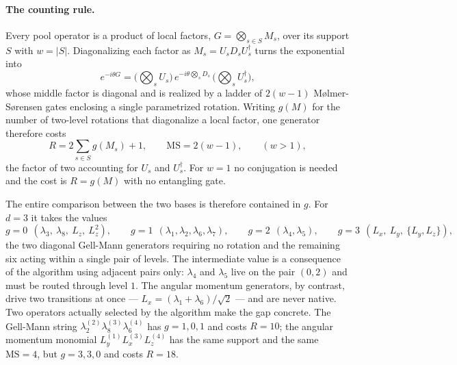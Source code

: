 \paragraph{The counting rule.} Every pool operator is a product of local factors, $G=\bigotimes_{s\in S} M_s$, over its support $S$ with $w=|S|$. Diagonalizing each factor as $M_s = U_s D_s U_s^\dagger$ turns the exponential into
\begin{equation}
\label{eq:ladder}
e^{-i\theta G}=\Big(\bigotimes_{s} U_s\Big)\,
e^{-i\theta \bigotimes_{s} D_s}\,
\Big(\bigotimes_{s} U_s^\dagger\Big),
\end{equation}
whose middle factor is diagonal and is realized by a ladder of $2(w-1)$ M\o{}lmer-S\o{}rensen gates enclosing a single parametrized rotation. Writing $g(M)$ for the number of two-level rotations that diagonalize a local factor, one generator therefore costs
\begin{equation}
\label{eq:gate_rule}
R = 2\sum_{s\in S} g(M_s) + 1,
\qquad
\mathrm{MS} = 2(w-1),
\qquad (w>1),
\end{equation}
the factor of two accounting for $U_s$ and $U_s^\dagger$. For $w=1$ no conjugation is needed and the cost is $R=g(M)$ with no entangling gate.

The entire comparison between the two bases is therefore contained in $g$. For $d=3$ it takes the values
\begin{equation}
\label{eq:givens_rule}
g=0 \ \ (\lambda_3,\ \lambda_8,\ L_z,\ L_z^2),
\qquad
g=1 \ \ (\lambda_1,\lambda_2,\lambda_6,\lambda_7),
\qquad
g=2 \ \ (\lambda_4,\lambda_5),
\qquad
g=3 \ \ (L_x,\ L_y,\ \{L_y,L_z\}),
\end{equation}
the two diagonal Gell-Mann generators requiring no rotation and the remaining six acting within a single pair of levels. The intermediate value is a consequence of the algorithm using adjacent pairs only: $\lambda_4$ and $\lambda_5$ live on the pair $(0,2)$ and must be routed through level $1$. The angular momentum generators, by contrast, drive two transitions at once --- $L_x=(\lambda_1+\lambda_6)/\sqrt2$ --- and are never native. Two operators actually selected by the algorithm make the gap concrete. The Gell-Mann string $\lambda_2^{(2)}\lambda_8^{(3)}\lambda_6^{(4)}$ has $g=1,0,1$ and costs $R=10$; the angular momentum monomial $L_y^{(1)}L_x^{(3)}L_z^{(4)}$ has the same support and the same $\mathrm{MS}=4$, but $g=3,3,0$ and costs $R=18$.

